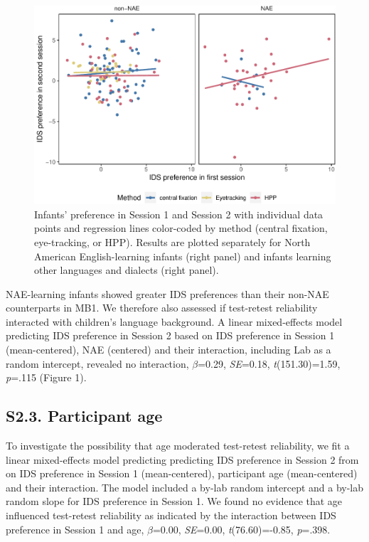 \documentclass[
  man, donotrepeattitle,floatsintext]{apa6}
\begin{document}
\begin{figure}
\centering
\includegraphics{MB1T_supplement_files/figure-latex/fig1-1.pdf}
\caption{\label{fig:fig1}Infants' preference in Session 1 and Session 2 with individual data points and regression lines color-coded by method (central fixation, eye-tracking, or HPP). Results are plotted separately for North American English-learning infants (right panel) and infants learning other languages and dialects (right panel).}
\end{figure}

NAE-learning infants showed greater IDS preferences than their non-NAE counterparts in MB1.
We therefore also assessed if test-retest reliability interacted with children's language background.
A linear mixed-effects model predicting IDS preference in Session 2 based on IDS preference in Session 1 (mean-centered), NAE (centered) and their interaction, including Lab as a random intercept, revealed no interaction, \(\beta\)=0.29, \emph{SE}=0.18, \emph{t}(151.30)=1.59, \emph{p}=.115 (Figure 1).

\hypertarget{s2.3.-participant-age}{%
\subsection{S2.3. Participant age}\label{s2.3.-participant-age}}

To investigate the possibility that age moderated test-retest reliability, we fit a linear mixed-effects model predicting predicting IDS preference in Session 2 from on IDS preference in Session 1 (mean-centered), participant age (mean-centered) and their interaction.
The model included a by-lab random intercept and a by-lab random slope for IDS preference in Session 1.
We found no evidence that age influenced test-retest reliability as indicated by the interaction between IDS preference in Session 1 and age, \(\beta\)=0.00, \emph{SE}=0.00, \emph{t}(76.60)=-0.85, \emph{p}=.398.
\end{document}
